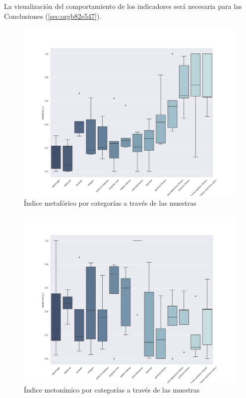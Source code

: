 \documentclass[12pt,letterpaper,twoside]{article}
\begin{document}
La visualización del comportamiento de los indicadores será necesaria para las Conclusiones (\ref{sec:orgb82e547}).

\begin{figure}[H]
\centering
\includegraphics[width=0.9\linewidth]{./resultados/graphs/total/accum_cat_metafora.png}
\caption{\label{fig:metafora_categorias} Índice metafórico por categorías a través de las muestras }
\end{figure}
\begin{figure}[H]
\centering
\includegraphics[width=0.9\linewidth]{./resultados/graphs/total/accum_cat_metonimia.png}
\caption{\label{fig:metonimia_categorias} Índice metonímico por categorías a través de las muestras  }
\end{figure}
\end{document}
